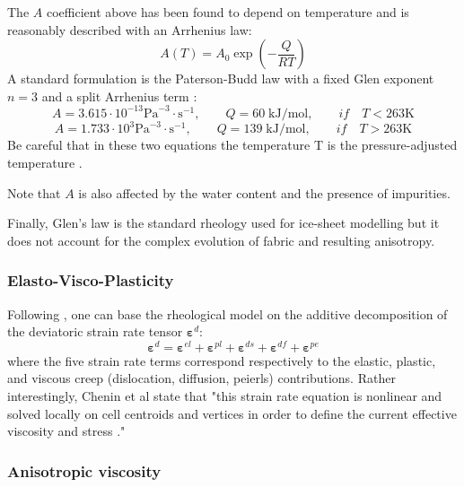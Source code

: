 The $A$ coefficient above has been found to depend on temperature and is reasonably described 
with an Arrhenius law:
\[
A(T)=A_0 \exp\left( -\frac{Q}{RT} \right)
\]
A standard formulation is the Paterson-Budd law with a fixed Glen exponent $n=3$ and 
a split Arrhenius term \cite{pabu82}:
\[
A=3.615 \cdot 10^{-13} \text{Pa}^{-3}\cdot \text{s}^{-1}, \qquad Q=60 \; \text{kJ}/\text{mol}, \qquad if\quad T<263\text{K} 
\]
\[
A=1.733\cdot 10^{3} \text{Pa}^{-3}\cdot \text{s}^{-1}, \qquad  Q=139 \; \text{kJ}/\text{mol}, \qquad if\quad T>263\text{K}
\]
Be careful that in these two equations the temperature T is the pressure-adjusted temperature \cite{pabu82}.


Note that $A$ is also affected by the water content and the presence of impurities. 

Finally, Glen's law is the standard rheology used for ice-sheet modelling 
but it does not account for the complex evolution of fabric and resulting anisotropy.

\Literature \cite{grev97,krab16,grbl09}


\subsubsection{Elasto-Visco-Plasticity}

\cite{anpa19} \cite{egat10}

Following \cite{chmd19}, one can base the rheological model on the additive decomposition of the 
deviatoric strain rate tensor ${\bm \varepsilon}^d$:
\[
{\bm \varepsilon}^d =
{\bm \varepsilon}^{el}+
{\bm \varepsilon}^{pl}+
{\bm \varepsilon}^{ds}+
{\bm \varepsilon}^{df}+
{\bm \varepsilon}^{pe}
\]
where the five strain rate terms correspond respectively to the elastic, plastic, and viscous creep (dislocation, diffusion, peierls) contributions. 
Rather interestingly, Chenin et al \cite{chmd19} state that "this strain rate equation is nonlinear
and solved locally on cell centroids and vertices in order to define the current effective viscosity 
and stress \cite{poso08}."




\subsubsection{Anisotropic viscosity}

